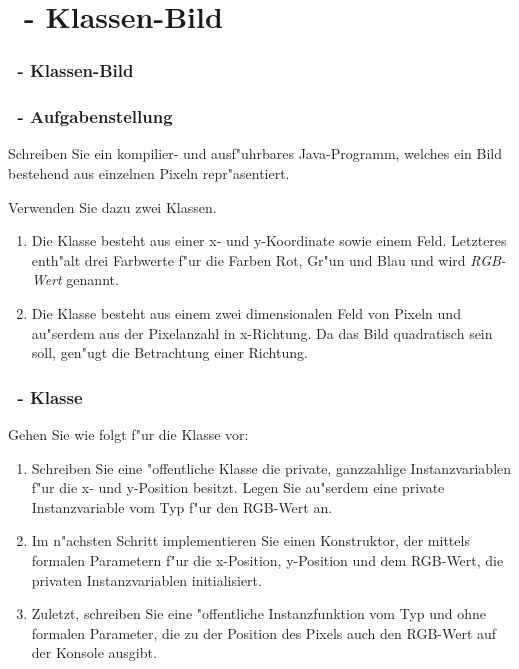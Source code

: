 \def\stitle{\theexercise\ - Klassen-Bild}
\section{\stitle}
\begin{frame}%
  \frametitle{\stitle}%
\tableofcontents[current]
\end{frame}



\begin{frame}%
  \frametitle{\theexercise\ - Aufgabenstellung}%

Schreiben Sie ein kompilier- und ausf"uhrbares Java-Programm, welches ein Bild bestehend aus einzelnen Pixeln repr"asentiert.
\bigskip

Verwenden Sie dazu zwei Klassen.
\begin{enumerate}
\item
Die Klasse  besteht aus einer x- und y-Koordinate \mbox{sowie} einem Feld.
Letzteres enth"alt drei Farbwerte f"ur die Farben Rot, Gr"un und Blau und wird \emph{RGB-Wert} genannt.
\item
Die Klasse  besteht aus einem zwei dimensionalen Feld von \mbox{Pixeln} und au"serdem aus der Pixelanzahl in \mbox{x-Richtung}.
Da das Bild quadratisch sein soll, gen"ugt die Betrachtung einer Richtung.
\end{enumerate}

\end{frame}






\begin{frame}%
  \frametitle{\theexercise\ - Klasse  }%

Gehen Sie wie folgt f"ur die Klasse  vor:
\begin{enumerate}
\item Schreiben Sie eine "offentliche Klasse  die private, ganzzahlige Instanzvariablen f"ur die x- und y-Position besitzt.
  Legen Sie au"serdem eine private Instanzvariable vom Typ  f"ur den RGB-Wert an.
\item Im n"achsten Schritt implementieren Sie einen Konstruktor, der mittels formalen Para\-metern f"ur die x-Position, y-Position und dem RGB-Wert, die privaten Instanzvariablen initialisiert.
\item Zuletzt, schreiben Sie eine "offentliche Instanzfunktion  vom Typ  und ohne formalen Parameter, die zu der Position des Pixels auch den RGB-Wert auf der Konsole ausgibt.
\end{enumerate}

\end{frame}


